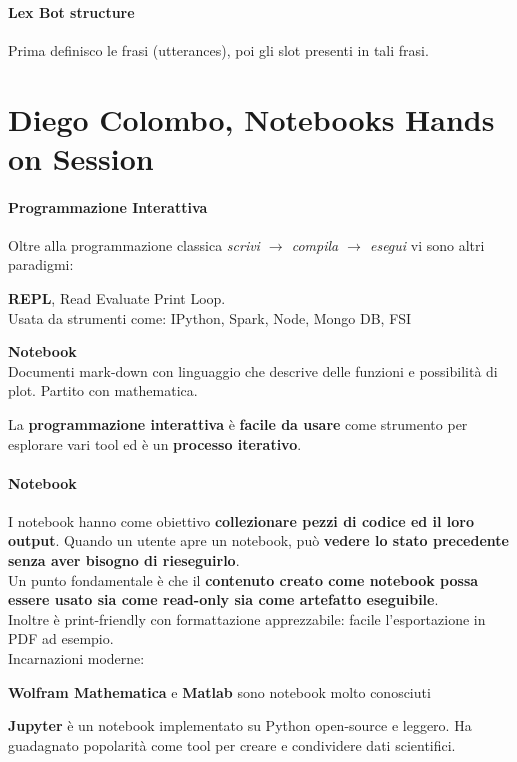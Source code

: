 \documentclass[10pt]{article}
\begin{document}
\paragraph{Lex Bot structure} Prima definisco le frasi (utterances), poi gli slot presenti in tali frasi.
\pagebreak
\section{Diego Colombo, Notebooks Hands on Session}
\paragraph{Programmazione Interattiva} Oltre alla programmazione classica \textit{scrivi $\rightarrow$ compila $\rightarrow$ esegui} vi sono altri paradigmi:
\begin{list}{}{}
	\item \textbf{REPL}, Read Evaluate Print Loop.\\
	Usata da strumenti come: IPython, Spark, Node, Mongo DB, FSI
	\item \textbf{Notebook}\\
	Documenti mark-down con linguaggio che descrive delle funzioni e possibilità di plot. Partito con mathematica.
\end{list}
La \textbf{programmazione interattiva} è \textbf{facile da usare} come strumento per esplorare vari tool ed è un \textbf{processo iterativo}.
\paragraph{Notebook} I notebook hanno come obiettivo \textbf{collezionare pezzi di codice ed il loro output}. Quando un utente apre un notebook, può \textbf{vedere lo stato precedente senza aver bisogno di rieseguirlo}.\\
Un punto fondamentale è che il \textbf{contenuto creato come notebook possa essere usato sia come read-only sia come artefatto eseguibile}.\\
Inoltre è print-friendly con formattazione apprezzabile: facile l'esportazione in PDF ad esempio.\\
Incarnazioni moderne:
\begin{list}{}{}
	\item \textbf{Wolfram Mathematica} e \textbf{Matlab} sono notebook molto conosciuti
	\item \textbf{Jupyter} è un notebook implementato su Python open-source e leggero. Ha guadagnato popolarità come tool per creare e condividere dati scientifici.
\end{list}
\end{document}
